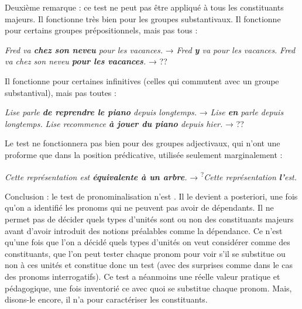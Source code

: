{    Deuxième remarque : ce test ne peut pas être appliqué à tous les constituants majeurs. Il fonctionne très bien pour les groupes substantivaux. Il fonctionne pour certains groupes prépositionnels, mais pas tous :
    
    \ea
    \ea     \textit{{Fred va} \textbf{{chez son neveu}}  {pour les vacances.}}     \textrm{→}   \textit{{Fred} \textbf{{y}}  {va pour les vacances.}}
    \ex     \textit{{Fred va chez son neveu} \textbf{{pour les vacances}}.}     \textrm{→}  ??
    \z
    \z

    Il fonctionne pour certaines infinitives (celles qui commutent avec un groupe substantival), mais pas toutes :

    \ea
    \ea     \textit{{Lise parle} \textbf{{de reprendre le piano}}  {depuis longtemps.}}    \textrm{→}   \textit{{Lise} \textbf{{en}}  {parle depuis longtemps.}}
    \ex     \textit{{Lise recommence} \textbf{{à jouer du piano}}  {depuis hier.}}     \textrm{→}  ??
    \z
    \z

    Le test ne fonctionnera pas bien pour des groupes adjectivaux, qui n’ont une proforme que dans la position prédicative, utilisée seulement marginalement :

    \ea
    \textit{{Cette représentation est} \textbf{{équivalente à un arbre}}.}     \textrm{→}  \textsuperscript{?}\textit{{Cette représentation} \textbf{{l’}}{est.}}
    \z

    Conclusion : le test de pronominalisation n’est . Il le devient a posteriori, une fois qu’on a identifié les pronoms qui ne peuvent pas avoir de dépendants. Il ne permet pas de décider quels types d’unités sont ou non des constituants majeurs avant d’avoir introduit des notions préalables comme la dépendance. Ce n’est qu’une fois que l’on a décidé quels types d’unités on veut considérer comme des constituants, que l’on peut tester chaque pronom pour voir s’il se substitue ou non à ces unités et constitue donc un test (avec des surprises comme dans le cas des pronoms interrogatifs). Ce test a néanmoins une réelle valeur pratique et pédagogique, une fois inventorié ce avec quoi se substitue chaque pronom. Mais, disons-le encore, il n’a  pour caractériser les constituants.

}
